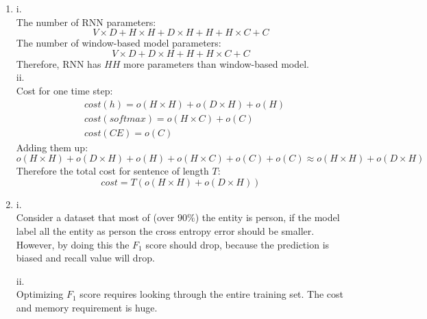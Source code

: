 \documentclass[10pt]{article}
\begin{document}
\begin{enumerate}[label=(\alph*)]
\item
i.\\
The number of RNN parameters:
$$
V \times D + H \times H + D \times H + H + H \times C + C
$$
The number of window-based model parameters:
$$
V \times D + D \times H + H + H \times C + C
$$
Therefore, RNN has $HH$ more parameters than window-based model.\\

ii.\\
Cost for one time step:
$$
\begin{aligned}
& cost(h) = o(H \times H) + o(D \times H) + o(H)\\
& cost(softmax) = o(H \times C) + o(C)\\
& cost(CE) = o(C)
\end{aligned}
$$
Adding them up:
$$
o(H \times H) + o(D \times H) + o(H) + o(H \times C) + o(C) + o(C) \approx o(H \times H) + o(D \times H)
$$
Therefore the total cost for sentence of length $T$:
$$
cost = T(o(H \times H) + o(D \times H))
$$

\item
i.\\
Consider a dataset that most of (over $90\%$) the entity is person,
if the model label all the entity as person the cross entropy error should be smaller.
However, by doing this the $F_1$ score should drop, because the prediction is biased and recall value will drop.

ii.\\
Optimizing $F_1$ score requires looking through the entire training set. The cost and memory requirement is huge.

\end{enumerate}
\end{document}
